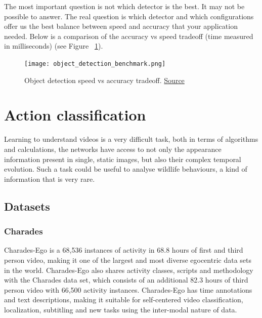The most important question is not which detector is the best. It may not be possible to answer. The real question is which detector and which configurations offer us the best balance between speed and accuracy that your application needed. Below is a comparison of the accuracy vs speed tradeoff (time measured in milliseconds) (see Figure ~\ref{fig:odbenchmark}).

\begin{figure}[H]
    \centering
    \texttt{[image: object\_detection\_benchmark.png]}
	\caption{Object detection speed vs accuracy tradeoff. \href{https://arxiv.org/pdf/1611.10012.pdf}{Source}}
	\label{fig:odbenchmark}
\end{figure}

\pagebreak\section{Action classification}

Learning to understand videos is a very difficult task, both in terms of algorithms and calculations, the networks have access to not only the appearance information present in single, static images, but also their complex temporal evolution. 
Such a task could be useful to analyse wildlife behaviours, a kind of information that is very rare.

\subsection{Datasets}

\subsubsection{Charades}
Charades-Ego\cite{charades} is a 68,536 instances of activity in 68.8 hours of first and third person video, making it one of the largest and most diverse egocentric data sets in the world. Charades-Ego also shares activity classes, scripts and methodology with the Charades data set, which consists of an additional 82.3 hours of third person video with 66,500 activity instances. Charades-Ego has time annotations and text descriptions, making it suitable for self-centered video classification, localization, subtitling and new tasks using the inter-modal nature of data.

